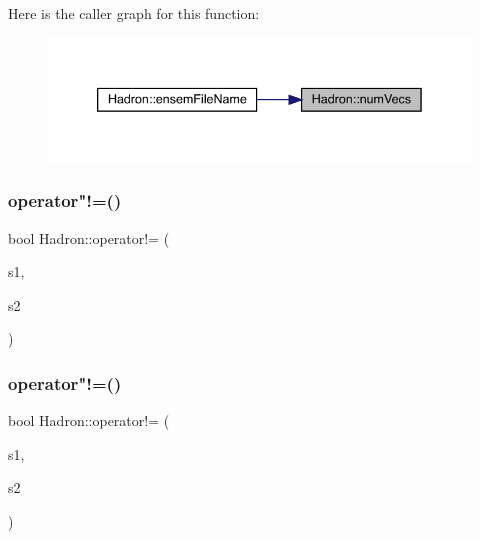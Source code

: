 Here is the caller graph for this function\+:
\nopagebreak
\begin{figure}[H]
\begin{center}
\leavevmode
\includegraphics[width=339pt]{d1/daf/namespaceHadron_afea9ddb2112da9cb61d87881799fff49_icgraph}
\end{center}
\end{figure}
\mbox{\label{namespaceHadron_aa7483984b4c081a23ba486c97ca05f5a}} 
\subsubsection{\texorpdfstring{operator"!=()}{operator!=()}\hspace{0.1cm}{\footnotesize\ttfamily [1/3]}}
{\footnotesize\ttfamily bool Hadron\+::operator!= (\begin{DoxyParamCaption}\item[{const \mbox{\hyperlink{structHadron_1_1QuarkNum__t}{Quark\+Num\+\_\+t}} \&}]{s1,  }\item[{const \mbox{\hyperlink{structHadron_1_1QuarkNum__t}{Quark\+Num\+\_\+t}} \&}]{s2 }\end{DoxyParamCaption})}

\mbox{\label{namespaceHadron_aa8d535bf12152ca7f5f44d089e5db4b1}} 
\subsubsection{\texorpdfstring{operator"!=()}{operator!=()}\hspace{0.1cm}{\footnotesize\ttfamily [2/3]}}
{\footnotesize\ttfamily bool Hadron\+::operator!= (\begin{DoxyParamCaption}\item[{const \mbox{\hyperlink{structHadron_1_1KeyHadronNPartNPtConnGraph__t}{Key\+Hadron\+N\+Part\+N\+Pt\+Conn\+Graph\+\_\+t}} \&}]{s1,  }\item[{const \mbox{\hyperlink{structHadron_1_1KeyHadronNPartNPtConnGraph__t}{Key\+Hadron\+N\+Part\+N\+Pt\+Conn\+Graph\+\_\+t}} \&}]{s2 }\end{DoxyParamCaption})}



